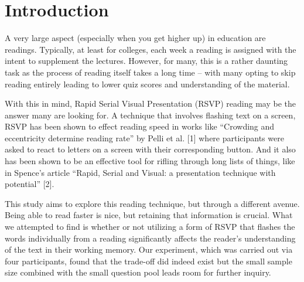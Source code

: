 \documentclass[manuscript,screen]{acmart}
\begin{document}


\maketitle

\section{Introduction}
A very large aspect (especially when you get higher up) in education are readings. Typically, at least for colleges, each week a reading is assigned with the intent to supplement the lectures. However, for many, this is a rather daunting task as the process of reading itself takes a long time – with many opting to skip reading entirely leading to lower quiz scores and understanding of the material.

With this in mind, Rapid Serial Visual Presentation (RSVP) reading may be the answer many are looking for. A technique that involves flashing text on a screen, RSVP has been shown to effect reading speed in works like “Crowding and eccentricity determine reading rate” by Pelli et al. [1] where participants were asked to react to letters on a screen with their corresponding button. And it also has been shown to be an effective tool for rifling through long lists of things, like in Spence’s article “Rapid, Serial and Visual: a presentation technique with potential” [2].

This study aims to explore this reading technique, but through a different avenue. Being able to read faster is nice, but retaining that information is crucial. What we attempted to find is whether or not utilizing a form of RSVP that flashes the words individually from a reading significantly affects the reader's understanding of the text in their working memory. Our experiment, which was carried out via four participants, found that the trade-off did indeed exist but the small sample size combined with the small question pool leads room for further inquiry.
\end{document}
